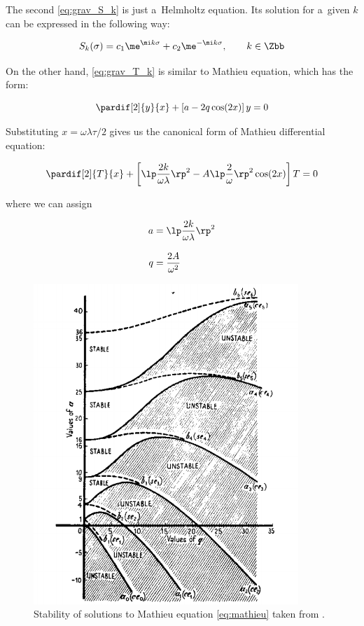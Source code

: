 \noindent
The second \cref{eq:grav_S_k} is just a~Helmholtz equation. Its solution for a~given $k$ can be expressed in the following way:

\begin{equation}
    S_k(\sigma) = c_1 \me^{\mi k \sigma} + c_2 \me^{-\mi k \sigma}, \qquad k \in \Zbb
\end{equation}

\noindent
On the other hand, \cref{eq:grav_T_k} is similar to Mathieu equation, which has the form:

\begin{equation}
\label{eq:mathieu}
    \pardif[2]{y}{x} + \left[ a - 2q \cos(2x) \right] y = 0
\end{equation}

\noindent
Substituting $x = \omega \lambda \tau /2$ gives us the canonical form of Mathieu differential equation:

\begin{equation}
    \pardif[2]{T}{x} + \left[ \lp \frac{2k}{\omega \lambda} \rp^2 - A \lp \frac{2}{\omega} \rp^2 \cos(2x) \right] T = 0
\end{equation}

\noindent
where we can assign 

\begin{align}
    a &= \lp \frac{2k}{\omega \lambda}\rp^2\\[0.3cm]
    q &= \frac{2A}{\omega^2}
\end{align}

\begin{figure}[h]
    \centering
    \includegraphics[width = 10cm]{Pictures/Mathieu_stability.PNG}
    \caption{Stability of solutions to Mathieu equation \eqref{eq:mathieu} taken from \cite{lachlan}.}
    \label{fig:mathieu_stability}
\end{figure}

